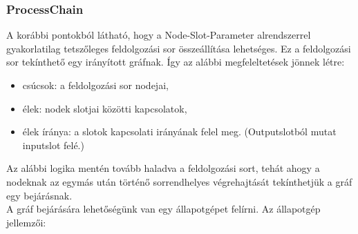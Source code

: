 \documentclass[a4paper,12pt,oneside]{report}
\begin{document}
\begin{landscape}
\begin{center}
\begin{figure}[h]
  \label{fig:bimg_dataflow}
\end{figure}
\end{center}
\end{landscape}

\subsubsection{ProcessChain}
A korábbi pontokból látható, hogy a Node-Slot-Parameter alrendszerrel gyakorlatilag tetszőleges feldolgozási sor összeállítása lehetséges. Ez a feldolgozási sor tekínthető egy irányított gráfnak. Így az alábbi megfeleltetések jönnek létre:
\begin{itemize}
	\itemsep0em
	\item csúcsok: a feldolgozási sor nodejai,
	\item élek: nodek slotjai közötti kapcsolatok,
	\item élek íránya: a slotok kapcsolati irányának felel meg. (Outputslotból mutat inputslot felé.)
\end{itemize}
Az alábbi logika mentén tovább haladva a feldolgozási sort, tehát ahogy a nodeknak az egymás után történő sorrendhelyes végrehajtását tekínthetjük a gráf egy bejárásnak.\\
A gráf bejárására lehetőségünk van egy állapotgépet felírni. Az állapotgép jellemzői:
\end{document}
